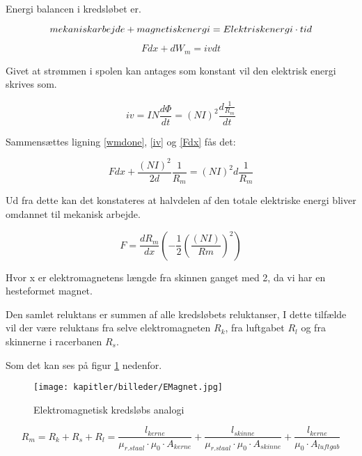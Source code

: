 Energi balancen i kredsløbet er.

\begin{equation}
\begin{centering}
mekanisk arbejde + magnetisk energi =Elektrisk energi \cdot tid
\end{centering}
\end{equation}

\begin{equation}
F dx + dW_m = iv dt
\label{Fdx}
\end{equation}

Givet at strømmen i spolen kan antages som konstant vil den elektrisk energi skrives som.

\begin{equation}
iv=IN \frac{d\Phi}{dt} =(NI)^2  \frac{d\frac{1}{R_m}}{dt}
\label{iv}
\end{equation}


Sammensættes ligning \ref{wmdone}, \ref{iv} og \ref{Fdx} fås det:

\begin{equation}
F dx+\frac{(NI)^2}{2d} \frac{1}{R_m} =(NI)^2  d \frac{1}{R_m}
\end{equation}

Ud fra dette kan det konstateres at halvdelen af den totale elektriske energi bliver omdannet til mekanisk arbejde.

\begin{equation}
F = \frac{dR_m}{dx} (-\frac{1}{2} (\frac{(NI)}{Rm} )^2 )
\end{equation}

Hvor x er elektromagnetens længde fra skinnen ganget med 2, da vi har en hesteformet magnet.

Den samlet reluktans er summen af alle kredsløbets reluktanser, I dette tilfælde vil der være reluktans fra selve elektromagneten $R_k$, fra luftgabet $R_l$ og fra skinnerne i racerbanen $R_s$.

Som det kan ses på figur \ref{fig:Mkreds} nedenfor.

\begin{figure}[ht]
	\centering
	\texttt{[image: kapitler/billeder/EMagnet.jpg]}
	\caption{Elektromagnetisk kredsløbs analogi}
		\label{fig:Mkreds}
	\end{figure}


\begin{equation}
\label{rm1}
R_m =R_k + R_s + R_l = \frac{l_{kerne}}{\mu_{r.staal} \cdot \mu_0 \cdot A_{kerne} } + \frac {l_{skinne}}{\mu_{r.staal} \cdot \mu_0 \cdot A_{skinne} }  + \frac {l_{kerne}}{\mu_0 \cdot A_{luftgab} }
\end{equation}

